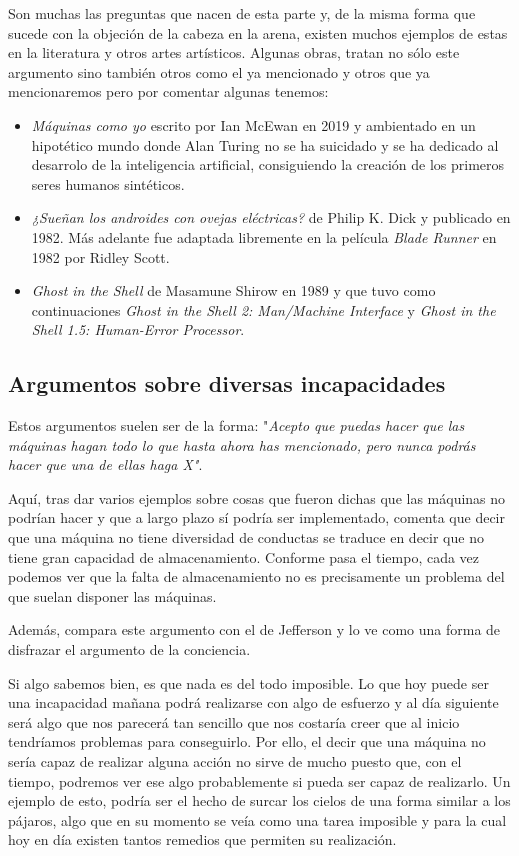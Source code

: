 \documentclass[12pt,a4paper]{article}
\begin{document}
Son muchas las preguntas que nacen de esta parte y, de la misma forma que sucede con la objeción de la cabeza en la arena, existen muchos ejemplos de estas en la literatura y otros artes artísticos. Algunas obras, tratan no sólo este argumento sino también otros como el ya mencionado y otros que ya mencionaremos pero por comentar algunas tenemos:

\begin{itemize}
\item \emph{Máquinas como yo}\cite{Maquinas} escrito por Ian McEwan en 2019 y ambientado en un hipotético mundo donde Alan Turing no se ha suicidado y se ha dedicado al desarrolo de la inteligencia artificial, consiguiendo la creación de los primeros seres humanos sintéticos.
\item \emph{¿Sueñan los androides con ovejas eléctricas?}\cite{Androides} de Philip K. Dick y publicado en 1982. Más adelante fue adaptada libremente en la película \emph{Blade Runner} en 1982 por Ridley Scott.
\item \emph{Ghost in the Shell}\cite{Shell} de Masamune Shirow en 1989 y que tuvo como continuaciones \emph{Ghost in the Shell 2: Man/Machine Interface} y \emph{Ghost in the Shell 1.5: Human-Error Processor}.
\end{itemize}

\subsection{Argumentos sobre diversas incapacidades}
Estos argumentos suelen ser de la forma: "\emph{Acepto que puedas hacer que las máquinas hagan todo lo que hasta ahora has mencionado, pero nunca podrás hacer que una de ellas haga X"}.

Aquí, tras dar varios ejemplos sobre cosas que fueron dichas que las máquinas no podrían hacer y que a largo plazo sí podría ser implementado, comenta que decir que una máquina no tiene diversidad de conductas se traduce en decir que no tiene gran capacidad de almacenamiento. Conforme pasa el tiempo, cada vez podemos ver que la falta de almacenamiento no es precisamente un problema del que suelan disponer las máquinas.

Además, compara este argumento con el de Jefferson y lo ve como una forma de disfrazar el argumento de la conciencia.

Si algo sabemos bien, es que nada es del todo imposible. Lo que hoy puede ser una incapacidad mañana podrá realizarse con algo de esfuerzo y al día siguiente será algo que nos parecerá tan sencillo que nos costaría creer que al inicio tendríamos problemas para conseguirlo. Por ello, el decir que una máquina no sería capaz de realizar alguna acción no sirve de mucho puesto que, con el tiempo, podremos ver ese algo probablemente si pueda ser capaz de realizarlo. Un ejemplo de esto, podría ser el hecho de surcar los cielos de una forma similar a los pájaros, algo que en su momento se veía como una tarea imposible y para la cual hoy en día existen tantos remedios que permiten su realización.
\end{document}
